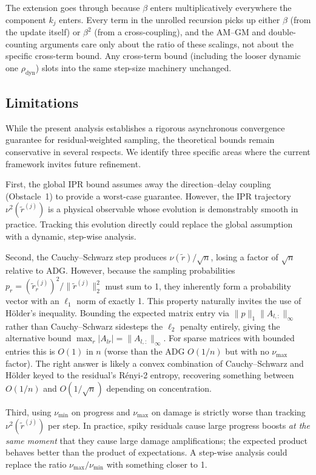 \documentclass[pdflatex,sn-mathphys-num]{sn-jnl}%
\theoremstyle{thmstyleone}%
\theoremstyle{thmstyletwo}%
\theoremstyle{thmstylethree}%
\begin{document}
The extension goes through because $\beta$ enters multiplicatively everywhere the component $k_j$ enters. Every term in the unrolled recursion picks up either $\beta$ (from the update itself) or $\beta^2$ (from a cross-coupling), and the AM--GM and double-counting arguments care only about the ratio of these scalings, not about the specific cross-term bound. Any cross-term bound (including the looser dynamic one $\rho_{\text{dyn}}$) slots into the same step-size machinery unchanged.

\subsection{Limitations}
\label{sec:limitations}

While the present analysis establishes a rigorous asynchronous convergence guarantee for residual-weighted sampling, the theoretical bounds remain conservative in several respects. We identify three specific areas where the current framework invites future refinement.

First, the global IPR bound assumes away the direction--delay coupling (Obstacle~1) to provide a worst-case guarantee. However, the IPR trajectory $\nu^2(\tilde r^{(j)})$ is a physical observable whose evolution is demonstrably smooth in practice. Tracking this evolution directly could replace the global assumption with a dynamic, step-wise analysis.

Second, the Cauchy--Schwarz step produces $\nu(\tilde r)/\sqrt n$, losing a factor of $\sqrt n$ relative to ADG. However, because the sampling probabilities $p_r = (\tilde r_r^{(j)})^2/\|\tilde r^{(j)}\|_2^2$ must sum to 1, they inherently form a probability vector with an $\ell_1$ norm of exactly 1. This property naturally invites the use of H\"older's inequality. Bounding the expected matrix entry via $\|p\|_1 \|A_{l,:}\|_\infty$ rather than Cauchy--Schwarz sidesteps the $\ell_2$ penalty entirely, giving the alternative bound $\max_r |A_{lr}| = \|A_{l,:}\|_\infty$. For sparse matrices with bounded entries this is $O(1)$ in $n$ (worse than the ADG $O(1/n)$ but with no $\nu_{\max}$ factor). The right answer is likely a convex combination of Cauchy--Schwarz and H\"older keyed to the residual's R\'enyi-2 entropy, recovering something between $O(1/n)$ and $O(1/\sqrt n)$ depending on concentration.

Third, using $\nu_{\min}$ on progress and $\nu_{\max}$ on damage is strictly worse than tracking $\nu^2(\tilde r^{(j)})$ per step. In practice, spiky residuals cause large progress boosts \emph{at the same moment} that they cause large damage amplifications; the expected product behaves better than the product of expectations. A step-wise analysis could replace the ratio $\nu_{\max}/\nu_{\min}$ with something closer to 1.
\end{document}
